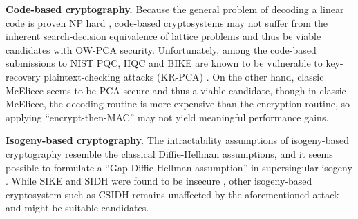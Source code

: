 \documentclass[journal=tches,submission]{iacrtrans}
\begin{document}
\textbf{Code-based cryptography.} Because the general problem of decoding a linear code is proven NP hard \cite{DBLP:journals/tit/BerlekampMT78}, code-based cryptosystems may not suffer from the inherent search-decision equivalence of lattice problems and thus be viable candidates with OW-PCA security. Unfortunately, among the code-based submissions to NIST PQC, HQC \cite{melchor2018hamming} and BIKE \cite{aragon2022bike} are known to be vulnerable to key-recovery plaintext-checking attacks (KR-PCA) \cite{DBLP:journals/tches/TanakaUXITH23}. On the other hand, classic McEliece \cite{classicmceliecespec} seems to be PCA secure and thus a viable candidate, though in classic McEliece, the decoding routine is more expensive than the encryption routine, so applying ``encrypt-then-MAC'' may not yield meaningful performance gains.

\textbf{Isogeny-based cryptography.} The intractability assumptions of isogeny-based cryptography resemble the classical Diffie-Hellman assumptions, and it seems possible to formulate a ``Gap Diffie-Hellman assumption'' in supersingular isogeny \cite{DBLP:conf/icisc/FujiokaTTY18}. While SIKE and SIDH were found to be insecure \cite{DBLP:conf/eurocrypt/CastryckD23}, other isogeny-based cryptosystem such as CSIDH \cite{DBLP:conf/asiacrypt/Castryck0MPR18} remains unaffected by the aforementioned attack and might be suitable candidates.






\end{document}
